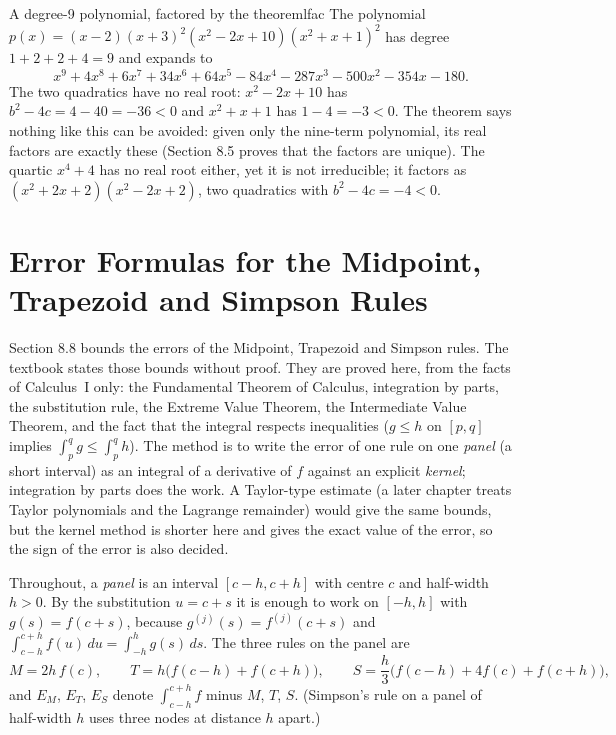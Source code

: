 \documentclass[11pt]{article}
\begin{document}
\begin{exmp}{A degree-9 polynomial, factored by the theorem}{lfac}
The polynomial $p(x)=(x-2)(x+3)^2\left(x^2-2x+10\right)\left(x^2+x+1\right)^2$ has degree $1+2+2+4=9$ and expands to
\[
x^9+4x^8+6x^7+34x^6+64x^5-84x^4-287x^3-500x^2-354x-180 .
\]
The two quadratics have no real root: $x^2-2x+10$ has $b^2-4c=4-40=-36<0$ and $x^2+x+1$ has $1-4=-3<0$. The theorem says nothing like this can be avoided: given only the nine-term polynomial, its real factors are exactly these (Section 8.5 proves that the factors are unique). The quartic $x^4+4$ has no real root either, yet it is not irreducible; it factors as $\left(x^2+2x+2\right)\left(x^2-2x+2\right)$, two quadratics with $b^2-4c=-4<0$.
\end{exmp}



\section{Error Formulas for the Midpoint, Trapezoid and Simpson Rules}

Section 8.8 bounds the errors of the Midpoint, Trapezoid and Simpson rules. The textbook states those bounds without proof. They are proved here, from the facts of Calculus~I only: the Fundamental Theorem of Calculus, integration by parts, the substitution rule, the Extreme Value Theorem, the Intermediate Value Theorem, and the fact that the integral respects inequalities ($g\le h$ on $[p,q]$ implies $\int_p^qg\le\int_p^qh$). The method is to write the error of one rule on one \emph{panel} (a short interval) as an integral of a derivative of $f$ against an explicit \emph{kernel}; integration by parts does the work. A Taylor-type estimate (a later chapter treats Taylor polynomials and the Lagrange remainder) would give the same bounds, but the kernel method is shorter here and gives the exact value of the error, so the sign of the error is also decided.

Throughout, a \emph{panel} is an interval $[c-h,c+h]$ with centre $c$ and half-width $h>0$. By the substitution $u=c+s$ it is enough to work on $[-h,h]$ with $g(s)=f(c+s)$, because $g^{(j)}(s)=f^{(j)}(c+s)$ and $\int_{c-h}^{c+h}f(u)\,du=\int_{-h}^{h}g(s)\,ds$. The three rules on the panel are
\[M=2h\,f(c),\qquad T=h\big(f(c-h)+f(c+h)\big),\qquad S=\frac h3\big(f(c-h)+4f(c)+f(c+h)\big),\]
and $E_M$, $E_T$, $E_S$ denote $\int_{c-h}^{c+h}f$ minus $M$, $T$, $S$. (Simpson's rule on a panel of half-width $h$ uses three nodes at distance $h$ apart.)
\end{document}
